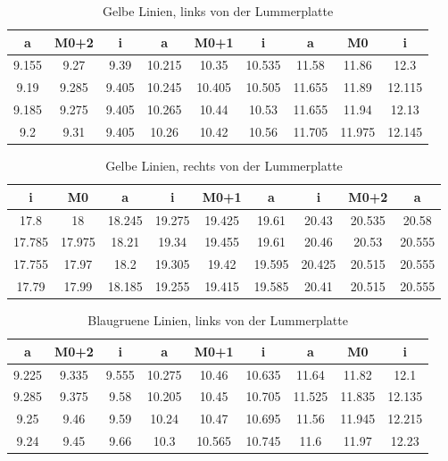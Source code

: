 \documentclass[a4paper,parskip,11pt, DIV12]{scrreprt}
\begin{document}
	\begin{table}[H]
	\begin{tabular}{|c|c|c||c|c|c||c|c|c|}
	\hline 
a	&	M0+2	&	i	&	a	&	M0+1	&	i	&	a	&	M0	&	i	\\
	\hline
	\hline
9.155	&	9.27	&	9.39	&	10.215	&	10.35	&	10.535	&	11.58	&	11.86	&	12.3	\\
	\hline
9.19	&	9.285	&	9.405	&	10.245	&	10.405	&	10.505	&	11.655	&	11.89	&	12.115	\\
	\hline
9.185	&	9.275	&	9.405	&	10.265	&	10.44	&	10.53	&	11.655	&	11.94	&	12.13	\\
	\hline
9.2	&	9.31	&	9.405	&	10.26	&	10.42	&	10.56	&	11.705	&	11.975	&	12.145	\\
	\hline
	\end{tabular}
	\caption{Gelbe Linien, links von der Lummerplatte}
	\end{table}
	
	\begin{table}[H]	
	\begin{tabular}{|c|c|c||c|c|c||c|c|c|}
	\hline 
i	&	M0	&	a	&	i	&	M0+1	&	a	&	i	&	M0+2	&	a	\\
	\hline
	\hline
17.8	&	18	&	18.245	&	19.275	&	19.425	&	19.61	&	20.43	&	20.535	&	20.58	\\
	\hline
17.785	&	17.975	&	18.21	&	19.34	&	19.455	&	19.61	&	20.46	&	20.53	&	20.555	\\
	\hline
17.755	&	17.97	&	18.2	&	19.305	&	19.42	&	19.595	&	20.425	&	20.515	&	20.555	\\
	\hline
17.79	&	17.99	&	18.185	&	19.255	&	19.415	&	19.585	&	20.41	&	20.515	&	20.555	\\
	\hline
	\end{tabular} 
	\caption{Gelbe Linien, rechts von der Lummerplatte}
	\end{table}
	
	\begin{table}[H]	
	\begin{tabular}{|c|c|c||c|c|c||c|c|c|}
	\hline 
a	&	M0+2	&	i	&	a	&	M0+1	&	i	&	a	&	M0	&	i	\\
	\hline
	\hline
9.225	&	9.335	&	9.555	&	10.275	&	10.46	&	10.635	&	11.64	&	11.82	&	12.1	\\
	\hline
9.285	&	9.375	&	9.58	&	10.205	&	10.45	&	10.705	&	11.525	&	11.835	&	12.135	\\
	\hline
9.25	&	9.46	&	9.59	&	10.24	&	10.47	&	10.695	&	11.56	&	11.945	&	12.215	\\
	\hline
9.24	&	9.45	&	9.66	&	10.3	&	10.565	&	10.745	&	11.6	&	11.97	&	12.23	\\
	\hline
	\end{tabular} 
	\caption{Blaugruene Linien, links von der Lummerplatte}
	\end{table}
	
\end{document}
